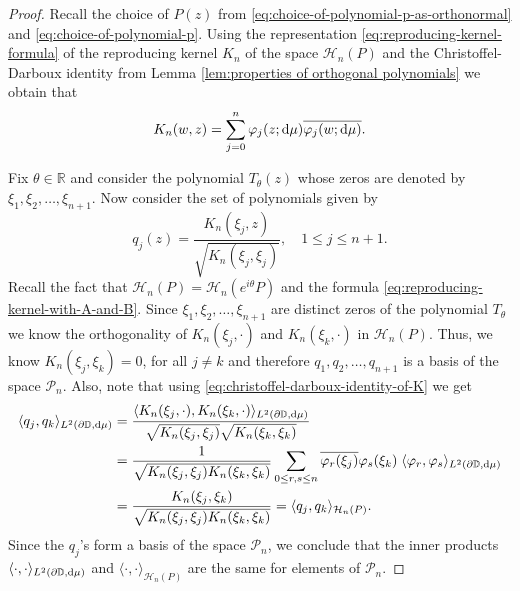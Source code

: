 \documentclass[10pt,a4paper]{amsart}
\def\P{\mathcal{P}}
\def\R{\mathbb{R}}
\renewcommand{\d}{\text{\rm d}}
\newcommand{\dD}{\partial\mathbb{D}}
\begin{document}
\begin{proof}
Recall the choice of $P(z)$ from \eqref{eq:choice-of-polynomial-p-as-orthonormal} and \eqref{eq:choice-of-polynomial-p}. Using the representation \eqref{eq:reproducing-kernel-formula} of the reproducing kernel $K_n$ of the space $\mathcal{H}_n(P)$ and the Christoffel-Darboux identity from Lemma \ref{lem:properties of orthogonal polynomials} we obtain that 
\begin{equation}\label{eq:christoffel-darboux-identity-of-K}
    K_n(w, z)=\sum_{j=0}^n \varphi_j(z;\d\mu)\overline{\varphi_j(w; \d\mu)}.
\end{equation}

Fix $\theta\in \R$ and consider the polynomial $T_\theta(z)$ whose zeros are denoted by $\xi_1, \xi_2, \ldots, \xi_{n+1}$. Now consider the set of polynomials given by 
\begin{equation*}
    q_j(z)=\frac{K_n(\xi_j, z)}{\sqrt{K_n(\xi_j, \xi_j)}}, \quad 1\leq j\leq n+1.
\end{equation*} 
Recall the fact that $\mathcal{H}_n(P)=\mathcal{H}_n(e^{i\theta}P)$ and the formula \eqref{eq:reproducing-kernel-with-A-and-B}. Since $\xi_1, \xi_2, \ldots, \xi_{n+1}$ are distinct zeros of the polynomial $T_\theta$ we know the orthogonality of $K_n(\xi_j, \cdot)$ and $K_n(\xi_k, \cdot)$ in $\mathcal{H}_n(P)$.  Thus, we know $K_n(\xi_j, \xi_k)=0$, for all $j\neq k$ and therefore $q_1, q_2, \ldots, q_{n+1}$ is a basis of the space $\mathcal{P}_n$. Also, note that using \eqref{eq:christoffel-darboux-identity-of-K} we get 
\begin{equation*}
    \begin{split}
        \langle q_j, q_k\rangle_{L^2(\dD, \d\mu)}&=\frac{\langle K_n(\xi_j, \cdot), K_n(\xi_k, \cdot)\rangle_{L^2(\dD, \d\mu)}}{\sqrt{K_n(\xi_j, \xi_j)}\sqrt{ K_n(\xi_k, \xi_k)}}\\
        &=\frac{1}{\sqrt{K_n(\xi_j, \xi_j) K_n(\xi_k, \xi_k)}}\sum_{0\leq r, s\leq n}\overline{\varphi_r(\xi_j)}\varphi_s(\xi_k)\; \langle \varphi_r, \varphi_s\rangle_{L^2(\dD, \d\mu)}\\
        &=\frac{K_n(\xi_j, \xi_k)}{\sqrt{K_n(\xi_j, \xi_j) K_n(\xi_k, \xi_k)}}=\langle q_j, q_k\rangle_{\mathcal{H}_n(P)}.
    \end{split}
\end{equation*}
Since the $q_j$'s form a basis of the space $\P_n$, we conclude that the inner products $\langle \cdot , \cdot \rangle_{L^2(\dD, \d\mu)}$  and $\langle \cdot, \cdot \rangle_{\mathcal{H}_n(P)}$ are the same for elements of $\P_n$. 
\medskip


\end{proof}
\end{document}

